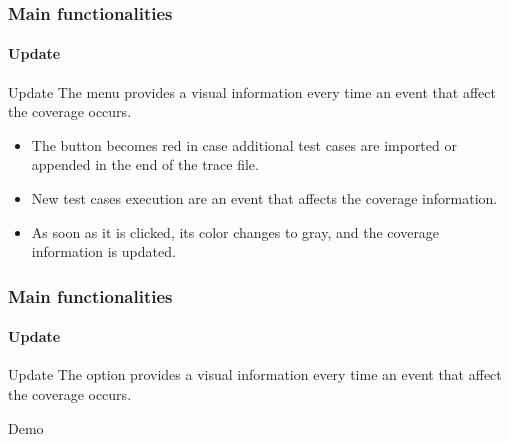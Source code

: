 \begin{frame}[parent={cmap:jabuti-gui},hasnext=true,hasprev=true]
\frametitle{Main functionalities}
\framesubtitle{Update}
\label{concept:update-menu}

\begin{block}{Update}
The  menu provides a visual information every time an event
that affect the coverage occurs.
\end{block}

\begin{block}{}
\begin{itemize}[<+->]
	\item The  button becomes red in case additional
	test cases are imported or appended in the end of the trace file.

	\item New test cases execution are an event that affects the coverage
	information.

	\item As soon as it is clicked, its color changes to gray, and the coverage
	information is updated.
\end{itemize}
\end{block}
\end{frame}


\begin{frame}
\frametitle{Main functionalities}
\framesubtitle{Update}
\label{concept:update}
\label{concept:update-and-cut}

\begin{block}{Update}
The  option provides a visual information every time an event
that affect the coverage occurs.
\end{block}

\begin{block}{Demo}
\end{block}
\end{frame}


%
%

